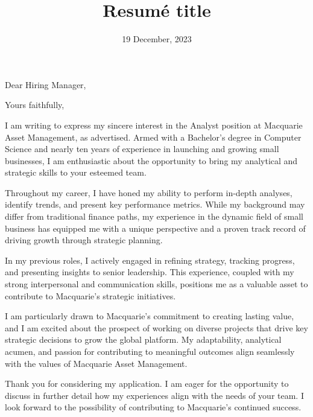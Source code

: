 \documentclass[11pt,a4paper,sans]{moderncv}        %
\title{Resumé title}                               %
\begin{document}
\date{19 December, 2023}
\opening{Dear Hiring Manager,}
\closing{Yours faithfully,}         %
\makelettertitle

I am writing to express my sincere interest in the Analyst position at Macquarie Asset Management, as advertised. Armed with a Bachelor's degree in Computer Science and nearly ten years of experience in launching and growing small businesses, I am enthusiastic about the opportunity to bring my analytical and strategic skills to your esteemed team.

Throughout my career, I have honed my ability to perform in-depth analyses, identify trends, and present key performance metrics. While my background may differ from traditional finance paths, my experience in the dynamic field of small business has equipped me with a unique perspective and a proven track record of driving growth through strategic planning.

In my previous roles, I actively engaged in refining strategy, tracking progress, and presenting insights to senior leadership. This experience, coupled with my strong interpersonal and communication skills, positions me as a valuable asset to contribute to Macquarie's strategic initiatives.

I am particularly drawn to Macquarie's commitment to creating lasting value, and I am excited about the prospect of working on diverse projects that drive key strategic decisions to grow the global platform. My adaptability, analytical acumen, and passion for contributing to meaningful outcomes align seamlessly with the values of Macquarie Asset Management.

Thank you for considering my application. I am eager for the opportunity to discuss in further detail how my experiences align with the needs of your team. I look forward to the possibility of contributing to Macquarie's continued success.

\makeletterclosing
\end{document}
